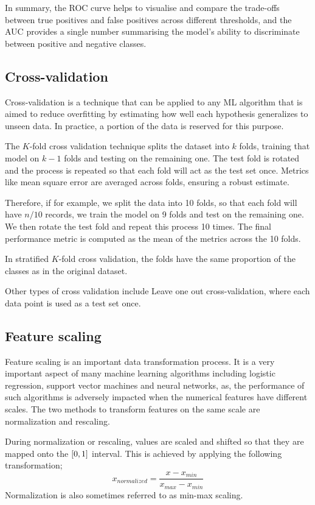 \documentclass[conference]{IEEEtran}
\begin{document}
	In summary, the ROC curve helps to visualise and compare the trade-offs between true positives and false positives across different thresholds, and the AUC provides a single number summarising the model's ability to discriminate between positive and negative classes.
	
	
	\subsection{Cross-validation}
	
	Cross-validation is a technique that can be applied to any ML algorithm that is aimed to reduce overfitting by estimating how well each hypothesis generalizes to unseen data. In practice, a portion of the data is reserved for this purpose.
	
	The $K$-fold cross validation technique splits the dataset into $k$ folds, training that model on $k-1$ folds and testing on the remaining one. The test fold is rotated and the process is repeated so that each fold will act as the test set once. Metrics like mean square error are averaged across folds, ensuring a robust estimate.
	
	Therefore, if for example, we split the data into 10 folds, so that each fold will have $n/10$ records, we train the model on 9 folds and test on the remaining one. We then rotate the test fold and repeat this process 10 times. The final performance metric is computed as the mean of the metrics across the 10 folds.
	
	In stratified $K$-fold cross validation, the folds have the same proportion of the classes as in the original dataset.
	
	Other types of cross validation include Leave one out cross-validation, where each data point is used as a test set once.
	
	\subsection{Feature scaling}
	
	Feature scaling is an important data transformation process. It is a very important aspect of many machine learning algorithms including logistic regression, support vector machines and neural networks, as, the performance of such algorithms is adversely impacted when the numerical features have different scales. The two methods to transform features on the same scale are normalization and rescaling.
	
	During normalization or rescaling, values are scaled and shifted so that they are mapped onto the $[0,\space 1]$ interval. This is achieved by applying the following transformation;
	$$
	x_{normalized} = \frac{x - x_{min}}{x_{max}-x_{min}}
	$$
	Normalization is also sometimes referred to as min-max scaling.
	
\end{document}
